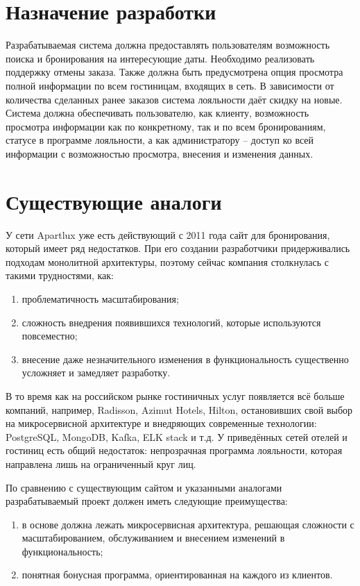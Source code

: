 \section*{Назначение разработки}
Разрабатываемая система должна предоставлять пользователям возможность поиска и бронирования на интересующие даты. Необходимо реализовать поддержку отмены заказа. Также должна быть предусмотрена опция просмотра полной информации по всем гостиницам, входящих в сеть. В зависимости от количества сделанных ранее заказов система лояльности даёт скидку на новые. Система должна обеспечивать пользователю, как клиенту, возможность просмотра информации как по конкретному, так и по всем бронированиям, статусе в программе лояльности, а как администратору -- доступ ко всей информации с возможностью просмотра, внесения и изменения данных.

\section*{Существующие аналоги}
У сети Apartlux уже есть действующий с 2011 года сайт для бронирования, который имеет ряд недостатков. При его создании разработчики придерживались подходам монолитной архитектуры, поэтому сейчас компания столкнулась с такими трудностями, как:
\begin{enumerate}
	\item проблематичность масштабирования;
	
	\item сложность внедрения появившихся технологий, которые используются повсеместно;
	
	\item внесение даже незначительного изменения в функциональность существенно усложняет и замедляет разработку.
\end{enumerate}

В то время как на российском рынке гостиничных услуг появляется всё больше компаний, например, Radisson, Azimut Hotels, Hilton, остановивших свой выбор на микросервисной архитектуре и внедряющих современные технологии: PostgreSQL, MongoDB, Kafka, ELK stack и т.д. У приведённых сетей отелей и гостиниц есть общий недостаток: непрозрачная программа лояльности, которая направлена лишь на ограниченный круг лиц.

По сравнению с существующим сайтом и указанными аналогами разрабатываемый проект должен иметь следующие преимущества:
\begin{enumerate}
	\item в основе должна лежать микросервисная архитектура, решающая сложности с масштабированием, обслуживанием и внесением изменений в функциональность;
	
	\item понятная бонусная программа, ориентированная на каждого из клиентов.
\end{enumerate}

